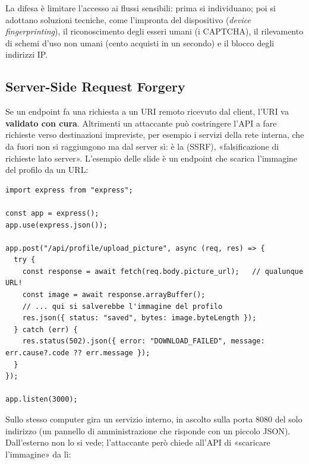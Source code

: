 La difesa è limitare l'accesso ai flussi sensibili: prima si individuano;
poi si adottano soluzioni tecniche, come l'impronta del dispositivo
(\textit{device fingerprinting}), il riconoscimento degli esseri umani (i
CAPTCHA), il rilevamento di schemi d'uso non umani (cento acquisti in un
secondo) e il blocco degli indirizzi IP.

\subsection{Server-Side Request Forgery}

Se un endpoint fa una richiesta a un URI remoto ricevuto dal client, l'URI va
\textbf{validato con cura}. Altrimenti un attaccante può costringere l'API a
fare richieste verso destinazioni impreviste, per esempio i servizi della rete
interna, che da fuori non si raggiungono ma dal server sì: è la
 (SSRF), «falsificazione di richieste lato
server». L'esempio delle slide è un endpoint che scarica l'immagine del profilo
da un URL:

\begin{lstlisting}[style=js, name=ssrf.js]
import express from "express";

const app = express();
app.use(express.json());

app.post("/api/profile/upload_picture", async (req, res) => {
  try {
    const response = await fetch(req.body.picture_url);   // qualunque URL!
    const image = await response.arrayBuffer();
    // ... qui si salverebbe l'immagine del profilo
    res.json({ status: "saved", bytes: image.byteLength });
  } catch (err) {
    res.status(502).json({ error: "DOWNLOAD_FAILED", message: err.cause?.code ?? err.message });
  }
});

app.listen(3000);
\end{lstlisting}

Sullo stesso computer gira un servizio interno, in ascolto sulla porta 8080 del
solo indirizzo  (un pannello di amministrazione che risponde con
un piccolo JSON). Dall'esterno non lo si vede; l'attaccante però chiede all'API
di «scaricare l'immagine» da lì:



